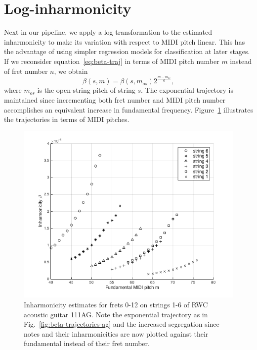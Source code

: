 \documentclass[12pt]{cmuthesis}
\begin{document}
\section{Log-inharmonicity}
Next in our pipeline, we apply a log transformation to the estimated inharmonicity to make its variation with respect to MIDI pitch linear. This has the advantage of using simpler regression models for classification at later stages. If we reconsider equation~\eqref{eq:beta-traj} in terms of MIDI pitch number $m$ instead of fret number $n$, we obtain
\begin{equation}
\beta(s,m) = \beta(s,m_{os})2^{\frac{m-m_{os}}{6}},
\end{equation}
where $m_{os}$ is the open-string pitch of string $s$. The exponential trajectory is maintained since incrementing both fret number and MIDI pitch number accomplishes an equivalent increase in fundamental frequency. Figure~\ref{fig:beta-v-midi} illustrates the trajectories in terms of MIDI pitches.

\begin{figure}[h] 
\label{fig:beta-v-midi}
\centering
\includegraphics[scale=0.7]{beta-v-midi}
\caption{Inharmonicity estimates for frets 0-12 on strings 1-6 of RWC acoustic guitar 111AG. Note the exponential trajectory as in Fig.~\ref{fig:beta-trajectories-ag} and the increased segregation since notes and their inharmonicities are now plotted against their fundamental instead of their fret number.}
\end{figure}
\end{document}
